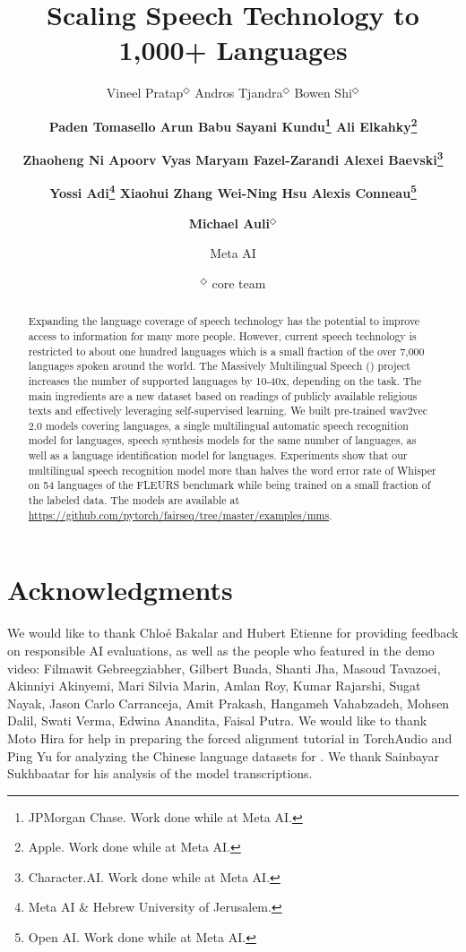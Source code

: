 \documentclass{article}
\title{Scaling Speech Technology to 1,000+ Languages}
\author{
\centering 
\centerline{
Vineel Pratap$^{\Diamond}$\quad
Andros Tjandra$^{\Diamond}$\quad
Bowen Shi$^{\Diamond}$ 
}\vspace{4mm}
\and
\centerline{\textbf{
Paden Tomasello\quad
Arun Babu\quad
Sayani Kundu\thanks{JPMorgan Chase. Work done while at Meta AI.}\quad
Ali Elkahky\thanks{Apple. Work done while at Meta AI.}
}}\vspace{4mm}\and
\centerline{\textbf{
Zhaoheng Ni\quad
Apoorv Vyas\quad
Maryam Fazel-Zarandi\quad
Alexei Baevski\thanks{Character.AI. Work done while at Meta AI.}
}}\vspace{4mm}\and
\centerline{\textbf{
Yossi Adi\thanks{Meta AI \& Hebrew University of Jerusalem.}\quad
Xiaohui Zhang\quad
Wei-Ning Hsu\quad
Alexis Conneau\thanks{Open AI. Work done while at Meta AI.}
}}\vspace{4mm}\and
\centerline{\textbf{
Michael Auli$^{\Diamond}$
}}
\vspace{4mm}
\and
{\normalfont Meta AI}\and
{\normalfont $^{\Diamond}$ core team}
}
\begin{document}
\maketitle
\vspace*{-0.18cm}
\begin{abstract}
Expanding the language coverage of speech technology has the potential to improve access to information for many more people.
However, current speech technology is restricted to about one hundred languages which is a small fraction of the over 7,000 languages spoken around the world.
The Massively Multilingual Speech (\modelname{}) project increases the number of supported languages by 10-40x, depending on the task.
The main ingredients are a new dataset based on readings of publicly available religious texts and effectively leveraging self-supervised learning.
We built pre-trained wav2vec 2.0 models covering \numptlang{} languages, a single multilingual automatic speech recognition model for \nummmslang{} languages, speech synthesis models for the same number of languages, as well as a language identification model for \numlidlang{} languages.
Experiments show that our multilingual speech recognition model more than halves the word error rate of Whisper on 54 languages of the FLEURS benchmark while being trained on a small fraction of the labeled data.
The \modelname{} models are available at \url{https://github.com/pytorch/fairseq/tree/master/examples/mms}.
\end{abstract}






















\section*{Acknowledgments}

We would like to thank Chlo\'{e} Bakalar and Hubert Etienne for providing feedback on responsible AI evaluations, as well as the people who featured in the demo video: 
Filmawit Gebreegziabher, Gilbert Buada, Shanti Jha, Masoud Tavazoei, Akinniyi Akinyemi, Mari Silvia Marin, Amlan Roy, Kumar Rajarshi, Sugat Nayak, Jason Carlo Carranceja, Amit Prakash, Hangameh Vahabzadeh, Mohsen Dalil, Swati Verma, Edwina Anandita, Faisal Putra.
We would like to thank Moto Hira for help in preparing the forced alignment tutorial in TorchAudio and Ping Yu for analyzing the Chinese language datasets for \modelname{}.
We thank Sainbayar Sukhbaatar for his analysis of the model transcriptions. 
\end{document}
